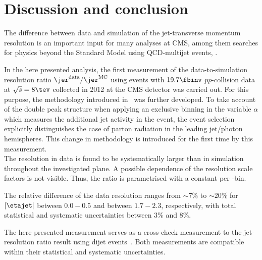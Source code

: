 \FloatBarrier
\chapter{Discussion and conclusion}
The difference between data and simulation of the jet-transverse momentum resolution is an important input for many analyses at CMS, among them searches for physics beyond the Standard Model using QCD-multijet events, \eg\cite{bib:CMS:RA2_8TeV}.

In the here presented analysis, the first measurement of the data-to-simulation resolution ratio $\jer^{\text{data}}/\jer^{\text{MC}}$ using \GAMJET events with $19.7\fbinv$ $pp$-collision data at $\sqrt{s}=8 \tev$ collected in 2012 at the CMS detector was carried out.
For this purpose, the methodology introduced in~\cite{bib:CMS:JERCPaper_2011,CMS:PAS:JETResolution_7TeV} was further developed.
To take account of the double peak structure when applying an exclusive binning in the variable $\alpha$ which measures the additional jet activity in the event, the event selection explicitly distinguishes the case of parton radiation in the leading jet/photon hemispheres.
This change in methodology is introduced for the first time by this measurement.\\


The resolution in data is found to be systematically larger than in simulation throughout the investigated \etajet plane. 
A possible \ptgamma dependence of the resolution scale factors \rhores is not visible. 
Thus, the ratio is parametrised with a constant per \etajet-bin.

The relative difference of the data resolution ranges from $\sim 7\%$ to $\sim20\%$ for $|\etajet|$ between $0.0-0.5$ and between $1.7-2.3$, respectively, with total statistical and systematic uncertainties between 3\% and 8\%.

The here presented measurement serves as a cross-check measurement to the jet-\pt resolution ratio result using dijet events~\cite{bib:CMS:JME_PAS,bib:Kristin_Thesis}.
Both measurements are compatible within their statistical and systematic uncertainties.\\


